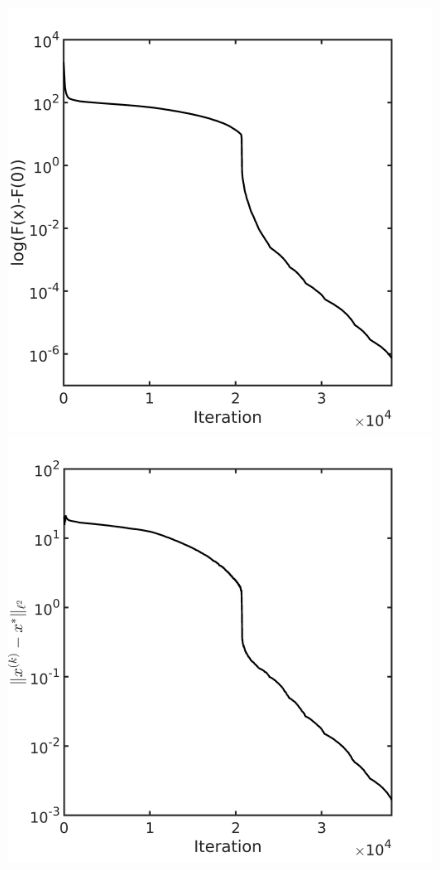 \documentclass[final,1p,times]{elsarticle}
\begin{document}
\begin{figure}[!htbp]
	\centering
	  \includegraphics[scale=0.18]{../figures/chrosen100D.png}
	  \includegraphics[scale=0.18]{../figures/chrosen100D_dist.png}
\end{figure}
\end{document}
